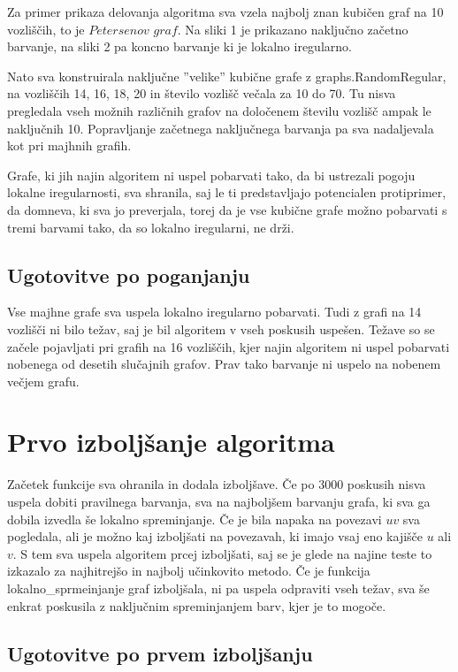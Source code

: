 \documentclass[12pt, a4paper]{article}
\begin{document}
Za primer prikaza delovanja algoritma sva vzela najbolj znan kubičen graf na 10 vozliščih, to je $Petersenov$ $graf$. Na sliki 1 je prikazano naključno začetno barvanje, na sliki 2 pa koncno barvanje ki je lokalno iregularno.

Nato sva konstruirala naključne ”velike” kubične grafe z graphs.RandomRegular, na vozliščih 14, 16, 18, 20 in število vozlišč večala za 10 do 70. Tu nisva pregledala vseh možnih različnih grafov na določenem številu vozlišč ampak le naključnih 10. Popravljanje začetnega naključnega barvanja pa sva nadaljevala kot pri majhnih grafih.

Grafe, ki jih najin algoritem ni uspel pobarvati tako, da bi ustrezali pogoju lokalne iregularnosti, sva shranila, saj le ti predstavljajo potencialen protiprimer, da domneva, ki sva jo preverjala, torej da je vse kubične grafe možno pobarvati s tremi barvami tako, da so lokalno iregularni, ne drži.

\subsection{Ugotovitve po poganjanju}

Vse majhne grafe sva uspela lokalno iregularno pobarvati. Tudi z grafi na 14 vozlišči ni bilo težav, saj je bil algoritem v vseh poskusih uspešen. Težave so se začele pojavljati pri grafih na 16 vozliščih, kjer najin algoritem ni uspel pobarvati nobenega od desetih slučajnih grafov. Prav tako barvanje ni uspelo na nobenem večjem grafu.


\section{Prvo izboljšanje algoritma}

Začetek funkcije sva ohranila in dodala izboljšave. Če po 3000 poskusih nisva uspela dobiti pravilnega barvanja, sva na najboljšem barvanju grafa, ki sva ga dobila izvedla še lokalno spreminjanje. Če je bila napaka na povezavi $uv$ sva pogledala, ali je možno kaj izboljšati na povezavah, ki imajo vsaj eno kajišče $u$ ali $v$. S tem sva uspela algoritem prcej izboljšati, saj se je glede na najine teste to izkazalo za najhitrejšo in najbolj učinkovito metodo. Če je funkcija lokalno_sprmeinjanje graf izboljšala, ni pa uspela odpraviti vseh težav, sva še enkrat poskusila z naključnim spreminjanjem barv, kjer je to mogoče.

\subsection{Ugotovitve po prvem izboljšanju}
\end{document}
